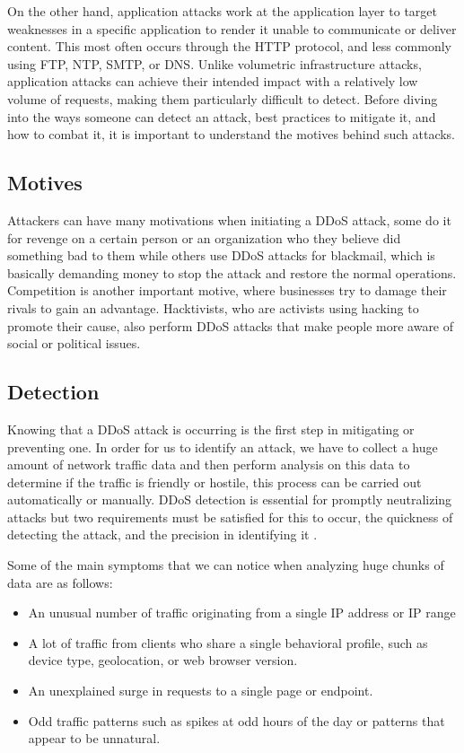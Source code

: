 \documentclass[a4paper, 12pt]{report} %
\begin{document}
\begin{table}[h!]
                    On the other hand, application attacks work at the application layer to target weaknesses in a specific application to render it unable to communicate or deliver content. This most often occurs through the HTTP protocol, and less commonly using FTP, NTP, SMTP, or DNS. Unlike volumetric infrastructure attacks, application attacks can achieve their intended impact with a relatively low volume of requests, making them particularly difficult to detect. 
                    Before diving into the ways someone can detect an attack, best practices to mitigate it, and how to combat it, it is important to understand the motives behind such attacks. 

                    \subsection{Motives}
                    Attackers can have many motivations when initiating a DDoS attack, some do it for revenge on a certain person or an organization who they believe did something bad to them while others use DDoS attacks for blackmail, which is basically demanding money to stop the attack and restore the normal operations. Competition is another important motive, where businesses try to damage their rivals to gain an advantage. Hacktivists, who are activists using hacking to promote their cause, also perform DDoS attacks that make people more aware of social or political issues.
                    
                    \subsection{Detection}
                        Knowing that a DDoS attack is occurring is the first step in mitigating or preventing one. In order for us to identify an attack, we have to collect a huge amount of network traffic data and then perform analysis on this data to determine if the traffic is friendly or hostile, this process can be carried out automatically or manually. DDoS detection is essential for promptly neutralizing attacks but two requirements must be satisfied for this to occur, the quickness of detecting the attack, and the precision in identifying it \cite{kentikDDoSDetection}.

                        Some of the main symptoms that we can notice when analyzing huge chunks of data are as follows:

                        \begin{itemize}
                            \item An unusual number of traffic originating from a single IP address or IP range
                            \item A lot of traffic from clients who share a single behavioral profile, such as device type, geolocation, or web browser version.
                            \item An unexplained surge in requests to a single page or endpoint.
                            \item Odd traffic patterns such as spikes at odd hours of the day or patterns that appear to be unnatural.


\end{itemize}
\end{table}
\end{document}
